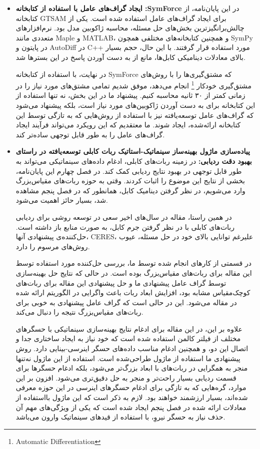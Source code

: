 \begin{itemize}
	
\item {\textbf{ایجاد گراف‌های عامل با استفاده از کتابخانه :SymForce} 
در این پایان‌نامه، از کتابخانه GTSAM برای ایجاد گراف‌های عامل استفاده شده است. یکی از چالش‌برانگیزترین بخش‌های حل مسئله، محاسبه ژاکوبین مدل بود. نرم‌افزارهای متعددی مانند Maple و MATLAB، و همچنین کتابخانه‌های مختلفی همچون SymPy در پایتون و AutoDiff در C++ مورد استفاده قرار گرفتند. با این حال، حجم بسیار بالای معادلات دینامیکی کابل‌ها، مانع از به دست آوردن پاسخ در این بسترها شد. 

در نهایت، با استفاده از کتابخانه SymForce که مشتق‌گیری‌ها را با روش‌های مشتق‌گیری خودکار
\footnote{Automatic Differentiation} 
 انجام می‌دهد، موفق شدیم تمامی مشتق‌های مورد نیاز را در زمانی کمتر از ۳۰ ثانیه محاسبه کنیم. 
پیشنهاد ما در این بخش، نه تنها استفاده از این کتابخانه برای به دست آوردن ژاکوبین‌های مورد نیاز است، بلکه پیشنهاد می‌شود که گراف‌های عامل توسعه‌یافته نیز با استفاده از روش‌هایی که به تازگی توسط این کتابخانه ارائه‌شده، ایجاد شوند. ما معتقدیم که این رویکرد می‌تواند فرآیند ایجاد گراف‌های عامل را به طور قابل توجهی ساده‌تر کند.}



\item \textbf{پیاده‌سازی ماژول بهینه‌ساز سینماتیک-استاتیک ربات کابلی توسعه‌یافته در راستای بهبود دقت ردیابی:} 
در زمینه ربات‌های کابلی، ادغام داده‌های سینماتیکی می‌تواند به طور قابل توجهی در بهبود نتایج ردیابی کمک کند. در فصل چهارم این پایان‌نامه، بخشی از نتایج این موضوع را اثبات کردند. وقتی به حوزه ربات‌های مقیاس‌بزرگ وارد می‌شویم، در نظر گرفتن دینامیک کابل، همانطور که در فصل پنجم مشاهده شد، بسیار حائز اهمیت می‌شود. 

در همین راستا، مقاله \cite{allak2022kinematics} در سال‌های اخیر سعی در توسعه روشی برای ردیابی ربات‌های کابلی با در نظر گرفتن جرم کابل، به صورت منابع باز داشته است. حل‌کننده‌ی پیشنهادی آنها، CERES، علیرغم توانایی بالای خود در حل مسئله، عیوب روش‌های مرسوم را دارد. 

در قسمتی از کارهای انجام شده توسط ما، بررسی حل‌کننده مورد استفاده توسط این مقاله برای ربات‌های مقیاس‌بزرگ بوده است. در حالی که نتایج حل بهینه‌سازی توسط گراف عامل پیشنهادی ما و حل پیشنهادی این مقاله برای ربات‌های کوچک‌مقیاس مشابه بود، افزایش ابعاد ربات باعث واگرایی در الگوریتم ارائه شده در مقاله می‌شود. این در حالی است که گراف عامل پیشنهادی به خوبی برای ربات‌های مقیاس‌بزرگ نتیجه را دنبال می‌کند.

علاوه بر این، در این مقاله برای ادغام نتایج بهینه‌سازی سینماتیکی با حسگر‌های مختلف از فیلتر کالمن استفاده شده است که خود نیاز به ایجاد ساختاری جدا و اتصال این دو، و همچنین ادغام مناسب داده‌های حسگر اینرسی-بینایی دارد. روش پیشنهادی ما استفاده از ماژول طراحی‌شده است. استفاده از این ماژول نه‌تنها منجر به همگرایی در ربات‌های با ابعاد بزرگ‌تر می‌شود، بلکه ادغام حسگرها برای قسمت ردیابی بسیار راحت‌تر و منجر به حل دقیق‌تری می‌شود. افزون بر این موارد، گره‌هایی که به تازگی برای ادغام حسگرهای اینرسی در این حوزه معرفی شده‌اند، بسیار ارزشمند خواهند بود. لازم به ذکر است که این ماژول بااستفاده از معادلات ارائه شده در فصل پنجم ایجاد شده است که یکی از ویژگی‌های مهم آن حذف نیاز به حسگر نیروِ، با استفاده از قید‌های سینماتیک وارون می‌باشد. 


\end{itemize}
